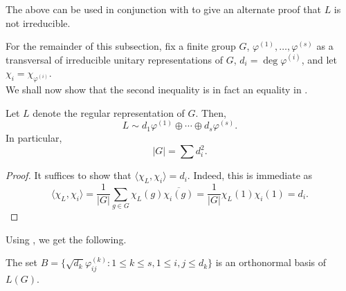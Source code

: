 		The above can be used in conjunction with  to give an alternate proof that $L$ is not irreducible.

		For the remainder of this subsection, fix a finite group $G$, $\varphi^{(1)},\ldots,\varphi^{(s)}$ as a transversal of irreducible unitary representations of $G$, $d_i = \deg \varphi^{(i)}$, and let $\chi_i = \chi_{\varphi^{(i)}}$.\\

		We shall now show that the second inequality is in fact an equality in .

		\begin{ftheo}
			\label{theo: sum of degree squared of irreds}
			Let $L$ denote the regular representation of $G$. Then,
			\[ L \sim d_1 \varphi^{(1)} \oplus \cdots \oplus d_s \varphi^{(s)}. \]
			In particular,
			\[ |G| = \sum d_i^2. \]
		\end{ftheo}
		\begin{proof}
			It suffices to show that $\langle \chi_L , \chi_i \rangle = d_i$. Indeed, this is immediate as
			\[ \langle \chi_L , \chi_i \rangle = \frac{1}{|G|} \sum_{g \in G} \chi_L(g) \overline{\chi_i(g)} = \frac{1}{|G|} \chi_L(1) \chi_i(1) = d_i. \]
		\end{proof}

		Using , we get the following.

		\begin{fcor}
			\label{cor: orthonormal basis of LG}
			The set $B = \{ \sqrt{d_k} \varphi_{ij}^{(k)} : 1 \le k \le s, 1 \le i,j \le d_k \}$ is an orthonormal basis of $L(G)$.
		\end{fcor}

